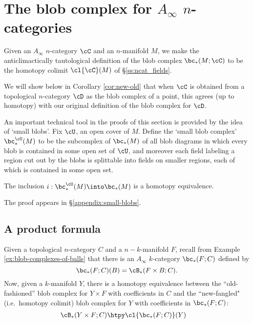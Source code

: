 
\section{The blob complex for $A_\infty$ $n$-categories}
\label{sec:ainfblob}
Given an $A_\infty$ $n$-category $\cC$ and an $n$-manifold $M$, we make the anticlimactically tautological definition of the blob
complex $\bc_*(M;\cC)$ to be the homotopy colimit $\cl{\cC}(M)$ of \S\ref{ss:ncat_fields}.

We will show below 
in Corollary \ref{cor:new-old}
that when $\cC$ is obtained from a topological $n$-category $\cD$ as the blob complex of a point, this agrees (up to homotopy) with our original definition of the blob complex
for $\cD$.

An important technical tool in the proofs of this section is provided by the idea of `small blobs'.
Fix $\cU$, an open cover of $M$.
Define the `small blob complex' $\bc^{\cU}_*(M)$ to be the subcomplex of $\bc_*(M)$ of all blob diagrams in which every blob is contained in some open set of $\cU$, and moreover each field labeling a region cut out by the blobs is splittable into fields on smaller regions, each of which is contained in some open set.

\begin{thm} \label{thm:small-blobs}
The inclusion $i: \bc^{\cU}_*(M) \into \bc_*(M)$ is a homotopy equivalence.
\end{thm}
The proof appears in \S \ref{appendix:small-blobs}.

\subsection{A product formula}
\label{ss:product-formula}



\begin{thm} \label{thm:product}
Given a topological $n$-category $C$ and a $n{-}k$-manifold $F$, recall from 
Example \ref{ex:blob-complexes-of-balls} that there is an  $A_\infty$ $k$-category $\bc_*(F; C)$ defined by
\begin{equation*}
\bc_*(F; C)(B) = \cB_*(F \times B; C).
\end{equation*}
Now, given a $k$-manifold $Y$, there is a homotopy equivalence between the ``old-fashioned'' 
blob complex for $Y \times F$ with coefficients in $C$ and the ``new-fangled" 
(i.e.\ homotopy colimit) blob complex for $Y$ with coefficients in $\bc_*(F; C)$:
\begin{align*}
\cB_*(Y \times F; C) & \htpy \cl{\bc_*(F; C)}(Y)
\end{align*}
\end{thm}


